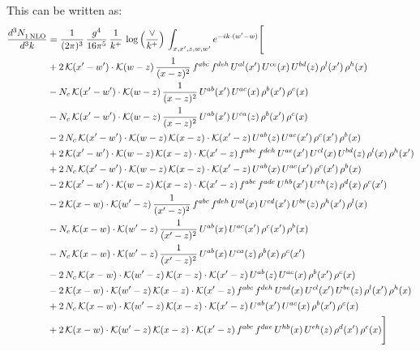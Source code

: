 \documentclass[9pt]{article}
\numberwithin{equation}{section}
\begin{document}
This can be written as:
\begin{align}
    \frac{d^{3}N_{1\,\rm NLO}^{\rm}}{d^{3}k}  & = \frac{1}{(2\pi)^{3}}\,\frac{g^{4}}{16\pi^{5}}\,\frac{1}{k^{+}}\,\log{\left(\frac{\vee}{k^{+}}\right)}\, \int_{x,x',z,w,w'}e^{-ik\cdot(w'-w)}\Bigg[\notag\\ & +2\,\mathcal{K}(x'-w')\cdot\mathcal{K}(w-z)\,\frac{1}{(x-z)^{2}}\,f^{abc}\,f^{deh}\,U^{al}(x')\,U^{ce}(x)\,U^{bd}(z)\,\rho^{l}(x')\,\rho^{h}(x)\notag \\ 
&-N_{c}\,\mathcal{K}(x'-w')\cdot\mathcal{K}(w-z)\,\frac{1}{(x-z)^{2}}\,U^{ab}(x')\,U^{ac}(x)\,\rho^{b}(x')\,\rho^{c}(x)\notag \\ 
&-N_{c}\,\mathcal{K}(x'-w')\cdot\mathcal{K}(w-z)\,\frac{1}{(x-z)^{2}}\,U^{ab}(x')\,U^{ca}(z)\,\rho^{b}(x')\,\rho^{c}(x)\notag \\ 
&-2\,N_{c}\,\mathcal{K}(x'-w')\cdot\mathcal{K}(w-z)\,\mathcal{K}(x-z)\cdot\mathcal{K}(x'-z)\,U^{ab}(z)\,U^{ac}(x')\,\rho^{c}(x')\,\rho^{b}(x)\notag \\ 
&+2\,\mathcal{K}(x'-w')\cdot\mathcal{K}(w-z)\,\mathcal{K}(x-z)\cdot\mathcal{K}(x'-z)\,f^{abc}\,f^{deh}\,U^{ae}(x')\,U^{cl}(x)\,U^{bd}(z)\,\rho^{l}(x)\,\rho^{h}(x')\notag \\ 
&+2\,N_{c}\,\mathcal{K}(x'-w')\cdot\mathcal{K}(w-z)\,\mathcal{K}(x-z)\cdot\mathcal{K}(x'-z)\,U^{ab}(x)\,U^{ac}(x')\,\rho^{c}(x')\,\rho^{b}(x)\notag \\ 
&-2\,\mathcal{K}(x'-w')\cdot\mathcal{K}(w-z)\,\mathcal{K}(x-z)\cdot\mathcal{K}(x'-z)\,f^{abc}\,f^{ade}\,U^{hb}(x')\,U^{eh}(z)\,\rho^{d}(x)\,\rho^{c}(x')\notag \\ 
&-2\,\mathcal{K}(x-w)\cdot\mathcal{K}(w'-z)\,\frac{1}{(x'-z)^{2}}\,f^{abc}\,f^{deh}\,U^{al}(x)\,U^{cd}(x')\,U^{be}(z)\,\rho^{h}(x')\,\rho^{l}(x)\notag \\ 
&-N_{c}\,\mathcal{K}(x-w)\cdot\mathcal{K}(w'-z)\,\frac{1}{(x'-z)^{2}}\,U^{ab}(x)\,U^{ac}(x')\,\rho^{c}(x')\,\rho^{b}(x)\notag \\ 
&-N_{c}\,\mathcal{K}(x-w)\cdot\mathcal{K}(w'-z)\,\frac{1}{(x'-z)^{2}}\,U^{ab}(x)\,U^{ca}(z)\,\rho^{b}(x)\,\rho^{c}(x')\notag \\ 
&-2\,N_{c}\,\mathcal{K}(x-w)\cdot\mathcal{K}(w'-z)\,\mathcal{K}(x-z)\cdot\mathcal{K}(x'-z)\,U^{ab}(z)\,U^{ac}(x)\,\rho^{b}(x')\,\rho^{c}(x)\notag \\ 
&-2\,\mathcal{K}(x-w)\cdot\mathcal{K}(w'-z)\,\mathcal{K}(x-z)\cdot\mathcal{K}(x'-z)\,f^{abc}\,f^{deh}\,U^{ad}(x)\,U^{cl}(x')\,U^{be}(z)\,\rho^{l}(x')\,\rho^{h}(x)\notag \\ 
&+2\,N_{c}\,\mathcal{K}(x-w)\cdot\mathcal{K}(w'-z)\,\mathcal{K}(x-z)\cdot\mathcal{K}(x'-z)\,U^{ab}(x')\,U^{ac}(x)\,\rho^{b}(x')\,\rho^{c}(x)\notag \\ 
&+2\,\mathcal{K}(x-w)\cdot\mathcal{K}(w'-z)\,\mathcal{K}(x-z)\cdot\mathcal{K}(x'-z)\,f^{abc}\,f^{dae}\,U^{hb}(x)\,U^{eh}(z)\,\rho^{d}(x')\,\rho^{c}(x)\Bigg]
\end{align}
\end{document}
